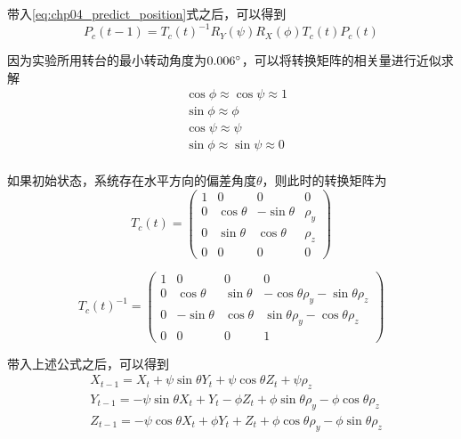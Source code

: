 带入\ref{eq:chp04_predict_position}式之后，可以得到
\begin{equation}
P_c(t-1) =T_c(t)^{-1}R_Y(\psi)R_X(\phi)T_c(t) P_c(t)
\end{equation}

因为实验所用转台的最小转动角度为$0.006 \degree$，可以将转换矩阵的相关量进行近似求解
\begin{align}
&\cos \phi \approx \cos \psi \approx 1 \\
&\sin \phi \approx \phi \\
&\cos \psi \approx \psi \\
&\sin \phi \approx \sin \psi \approx 0 \\
\end{align}

如果初始状态，系统存在水平方向的偏差角度$\theta$，则此时的转换矩阵为
\begin{equation}
T_c(t) =\begin{pmatrix} 1 & 0 & 0 & 0 \\ 0 & \cos \theta & -\sin \theta & \rho_y \\0 & \sin \theta & \cos \theta & \rho_z \\ 0 & 0 & 0 &0 \end{pmatrix}
\end{equation}

\begin{equation}
T_c(t)^{-1} =\begin{pmatrix} 1 & 0 & 0 & 0 \\ 0 & \cos \theta & \sin \theta & -\cos \theta \rho_y -\sin \theta \rho_z \\0 & -\sin \theta & \cos \theta & \sin\theta \rho_y-\cos \theta \rho_z \\ 0 & 0 & 0 & 1 \end{pmatrix}
\end{equation}

带入上述公式之后，可以得到
\begin{align}
&X_{t-1} = X_t + \psi \sin \theta Y_t + \psi \cos \theta Z_t + \psi \rho_z \\
&Y_{t-1} = -\psi \sin \theta X_t +  Y_ t - \phi Z_t + \phi \sin \theta \rho_y - \phi \cos \theta \rho_z \\
&Z_{t-1}  = -\psi \cos \theta X_t + \phi  Y_ t + Z_t + \phi \cos \theta \rho_y - \phi \sin \theta \rho_z
\end{align}

